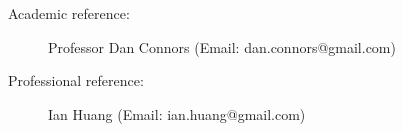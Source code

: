 \begin{description}
\item[Academic reference:]
Professor Dan Connors (Email: dan.connors@gmail.com)

\item[Professional reference:]
Ian Huang (Email: ian.huang@gmail.com)

\end{description}
